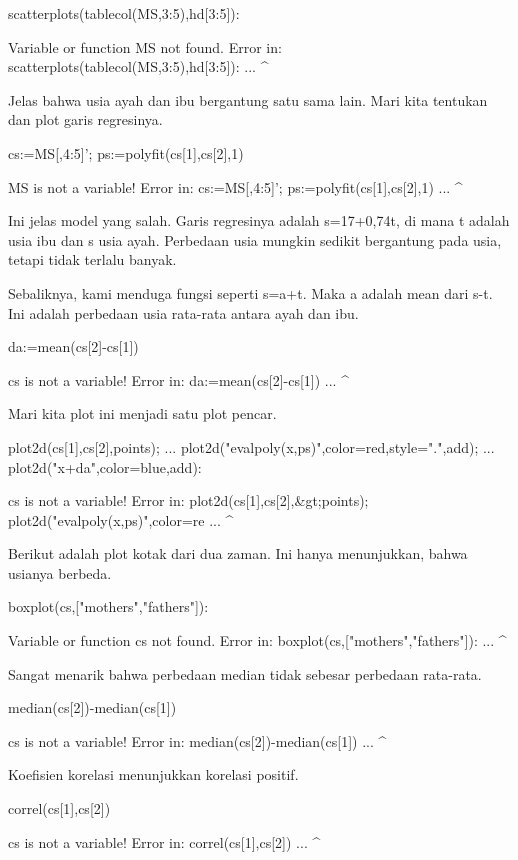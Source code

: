 \documentclass{article}
\begin{document}
\>scatterplots(tablecol(MS,3:5),hd[3:5]):


    Variable or function MS not found.
    Error in:
    scatterplots(tablecol(MS,3:5),hd[3:5]): ...
                            ^

Jelas bahwa usia ayah dan ibu bergantung satu sama lain. Mari kita
tentukan dan plot garis regresinya.


\>cs:=MS[,4:5]'; ps:=polyfit(cs[1],cs[2],1)


    MS is not a variable!
    Error in:
    cs:=MS[,4:5]'; ps:=polyfit(cs[1],cs[2],1) ...
                ^

Ini jelas model yang salah. Garis regresinya adalah s=17+0,74t, di
mana t adalah usia ibu dan s usia ayah. Perbedaan usia mungkin sedikit
bergantung pada usia, tetapi tidak terlalu banyak.


Sebaliknya, kami menduga fungsi seperti s=a+t. Maka a adalah mean dari
s-t. Ini adalah perbedaan usia rata-rata antara ayah dan ibu.


\>da:=mean(cs[2]-cs[1])


    cs is not a variable!
    Error in:
    da:=mean(cs[2]-cs[1]) ...
                  ^

Mari kita plot ini menjadi satu plot pencar.


\>plot2d(cs[1],cs[2],\>points);  ...  
\>   plot2d("evalpoly(x,ps)",color=red,style=".",\>add);  ...  
\>   plot2d("x+da",color=blue,\>add):


    cs is not a variable!
    Error in:
    plot2d(cs[1],cs[2],&gt;points);  plot2d("evalpoly(x,ps)",color=re ...
                ^

Berikut adalah plot kotak dari dua zaman. Ini hanya menunjukkan, bahwa
usianya berbeda.


\>boxplot(cs,["mothers","fathers"]):


    Variable or function cs not found.
    Error in:
    boxplot(cs,["mothers","fathers"]): ...
              ^

Sangat menarik bahwa perbedaan median tidak sebesar perbedaan
rata-rata.


\>median(cs[2])-median(cs[1])


    cs is not a variable!
    Error in:
    median(cs[2])-median(cs[1]) ...
                ^

Koefisien korelasi menunjukkan korelasi positif.


\>correl(cs[1],cs[2])


    cs is not a variable!
    Error in:
    correl(cs[1],cs[2]) ...
                ^
\end{document}
